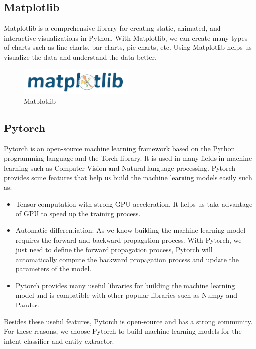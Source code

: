 \subsection{Matplotlib}
Matplotlib is a comprehensive library for creating static, animated, and interactive visualizations in Python. With Matplotlib, we can create many types of charts such as line charts, bar charts, pie charts, etc. Using Matplotlib helps us visualize the data and understand the data better.

\begin{figure}[ht]
    \centering
    \includegraphics[width=0.5\textwidth]{../Images/8.Technology_Stack/matplotlib_logo.png}
    \caption{Matplotlib}
    \label{fig:matplotlib}
\end{figure}

\subsection{Pytorch}
Pytorch is an open-source machine learning framework based on the Python programming language and the Torch library. It is used in many fields in machine learning such as Computer Vision and Natural language processing.  Pytorch provides some features that help us build the machine learning models easily such as:
\begin{itemize}
    \item Tensor computation with strong GPU acceleration. It helps us take advantage of GPU to speed up the training process.
    \item Automatic differentiation: As we know building the machine learning model requires the forward and backward propagation process. With Pytorch, we just need to define the forward propagation process, Pytorch will automatically compute the backward propagation process and update the parameters of the model.
    \item Pytorch provides many useful libraries for building the machine learning model and is compatible with other popular libraries such as Numpy and Pandas.
\end{itemize}

\noindent Besides these useful features, Pytorch is open-source and has a strong community. For these reasons, we choose Pytorch to build machine-learning models for the intent classifier and entity extractor.

